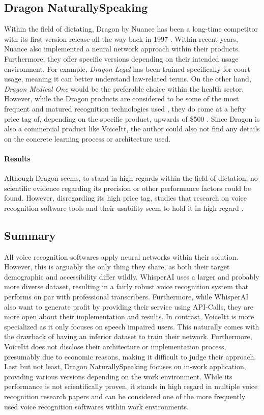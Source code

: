 \documentclass[draft,final]{vutinfth} %
\begin{document}
\subsection{Dragon NaturallySpeaking}
Within the field of dictating, Dragon by Nuance has been a long-time competitor with its first version release all the way back in 1997 \cite{mccrocklin2020revisiting}. Within recent years, Nuance also implemented a neural network approach within their products. Furthermore, they offer specific versions depending on their intended usage environment. For example, \emph{Dragon Legal} has been trained specifically for court usage, meaning it can better understand law-related terms. On the other hand,  \emph{Dragon Medical One} would be the preferable choice within the health sector. However, while the Dragon products are considered to be some of the most frequent and matured recognition technologies used \cite{shadiev2023review}, they do come at a hefty price tag of, depending on the specific product, upwards of \$500 \cite{Nuance}. Since Dragon is also a commercial product like VoiceItt, the author could also not find any details on the concrete learning process or architecture used.

\paragraph{Results}
Although Dragon seems,  to stand in high regards within the field of dictation, no scientific evidence regarding its precision or other performance factors could be found. However, disregarding its high price tag, studies that research on voice recognition software tools and their usability seem to hold it in high regard \cite{shadiev2023review, gandara2016voice}.

\subsection{Summary}
All voice recognition softwares apply neural networks within their solution. However, this is arguably the only thing they share, as both their target demographic and accessibility differ wildly. WhisperAI uses a larger and probably more diverse dataset, resulting in a fairly robust voice recognition system that performs on par with professional transcribers. Furthermore, while WhisperAI also want to generate profit by providing their service using API-Calls, they are more open about their implementation and results.
In contrast, VoiceItt is more specialized as it only focuses on speech impaired users. This naturally comes with the drawback of having an inferior dataset to train their network. Furthermore, VoiceItt does not disclose their architecture or implementation process, presumably due to economic reasons, making it difficult to judge their approach.
Last but not least, Dragon NaturallySpeaking focuses on in-work application, providing various versions depending on the work environment. While its performance is not scientifically proven, it stands in high regard in multiple voice recognition research papers and can be considered one of the more frequently used voice recognition softwares within work environments.
\end{document}
